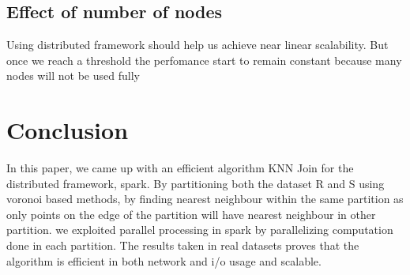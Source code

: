 \documentclass[conference]{IEEEtran}
\begin{document}
\subsection{Effect of number of nodes}
Using distributed framework should help us achieve near linear
scalability. But once we reach a threshold the perfomance start to
remain constant because many nodes will not be used fully


\medskip




\bigskip

\section{Conclusion}
In this paper, we came up with an efficient algorithm KNN Join for the
distributed framework, spark. By partitioning both the dataset R and S
using voronoi based methods, by finding nearest neighbour within the
same partition as only points on the edge of the partition will have
nearest neighbour in other partition. we exploited parallel processing
in spark by parallelizing computation done in each partition. The
results taken in real datasets proves that the algorithm is efficient
in both network and i/o usage and scalable.
\end{document}

